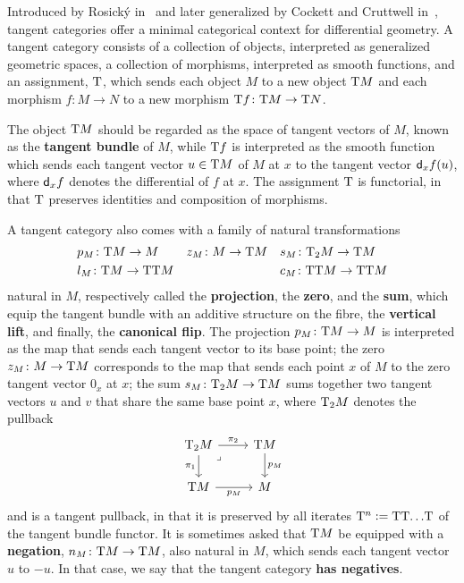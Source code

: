 \begin{content}
Introduced by Rosick\'y in~\cite{rosicky:tangent-cats} and later generalized by Cockett and Cruttwell in~\cite{cockett:tangent-cats}, tangent categories offer a minimal categorical context for differential geometry. A tangent category consists of a collection of objects, interpreted as generalized geometric spaces, a collection of morphisms, interpreted as smooth functions, and an assignment, $\mathrm{T}$, which sends each object $M$ to a new object $\mathrm{T} M$ and each morphism $f\colon M\to N$ to a new morphism $\mathrm{T} f\colon\mathrm{T} M\to\mathrm{T} N$.

The object $\mathrm{T} M$ should be regarded as the space of tangent vectors of $M$, known as the \textbf{tangent bundle} of $M$, while $\mathrm{T} f$ is interpreted as the smooth function which sends each tangent vector $u\in\mathrm{T} M$ of $M$ at $x$ to the tangent vector $\mathsf{d}_xf(u)$, where $\mathsf{d}_xf$ denotes the differential of $f$ at $x$. The assignment $\mathrm{T}$ is functorial, in that $\mathrm{T}$ preserves identities and composition of morphisms.

A tangent category also comes with a family of natural transformations
\begin{align*}
&p_M\colon\mathrm{T} M\to M         &&z_M\colon M\to\mathrm{T} M            &&s_M\colon\mathrm{T}_2M\to\mathrm{T} M\\
&l_M\colon\mathrm{T} M\to\mathrm{T}\mathrm{T} M     &&                              &&c_M\colon\mathrm{T}\mathrm{T} M\to\mathrm{T}\mathrm{T} M
\end{align*}
natural in $M$, respectively called the \textbf{projection}, the \textbf{zero}, and the \textbf{sum}, which equip the tangent bundle with an additive structure on the fibre, the \textbf{vertical lift}, and finally, the \textbf{canonical flip}. The projection $p_M\colon\mathrm{T} M\to M$ is interpreted as the map that sends each tangent vector to its base point; the zero $z_M\colon M\to\mathrm{T} M$ corresponds to the map that sends each point $x$ of $M$ to the zero tangent vector $0_x$ at $x$; the sum $s_M\colon\mathrm{T}_2M\to\mathrm{T} M$ sums together two tangent vectors $u$ and $v$ that share the same base point $x$, where $\mathrm{T}_2M$ denotes the pullback
\begin{equation*}
\begin{tikzcd}
{\T_2M} & {\T M} \\
{\T M} & M
\arrow["{\pi_2}", from=1-1, to=1-2]
\arrow["{\pi_1}"', from=1-1, to=2-1]
\arrow["\lrcorner"{anchor=center, pos=0.125}, draw=none, from=1-1, to=2-2]
\arrow["{p_M}", from=1-2, to=2-2]
\arrow["{p_M}"', from=2-1, to=2-2]
\end{tikzcd}
\end{equation*}
and is a tangent pullback, in that it is preserved by all iterates $\mathrm{T}^n\mathrel{\mathop:}=\mathrm{T}\mathrm{T}{\dots}\mathrm{T}$ of the tangent bundle functor. It is sometimes asked that $\mathrm{T} M$ be equipped with a \textbf{negation}, $n_M\colon\mathrm{T} M\to\mathrm{T} M$, also natural in $M$, which sends each tangent vector $u$ to $-u$. In that case, we say that the tangent category \textbf{has negatives}.


\end{content}
